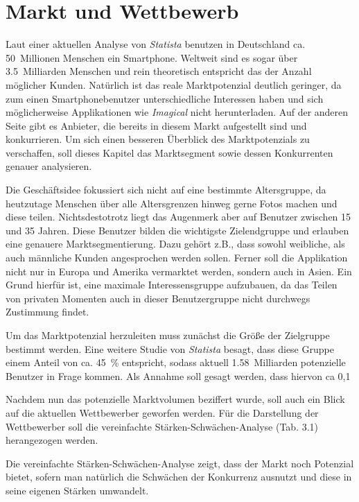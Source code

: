 \chapter{Markt und Wettbewerb}
Laut einer aktuellen Analyse von \textit{Statista} benutzen in Deutschland ca. 50~Millionen Menschen ein Smartphone. Weltweit sind es sogar über 3.5~Milliarden Menschen und rein theoretisch entspricht das der Anzahl möglicher Kunden. Natürlich ist das reale Marktpotenzial deutlich geringer, da zum einen Smartphonebenutzer unterschiedliche Interessen haben und sich möglicherweise Applikationen wie \textit{Imagical} nicht herunterladen. Auf der anderen Seite gibt es Anbieter, die bereits in diesem Markt aufgestellt sind und konkurrieren. Um sich einen besseren Überblick des Marktpotenzials zu verschaffen, soll dieses Kapitel das Marktsegment sowie dessen Konkurrenten genauer analysieren.

Die Geschäftsidee fokussiert sich nicht auf eine bestimmte Altersgruppe, da heutzutage Menschen über alle Altersgrenzen hinweg gerne Fotos machen und diese teilen. Nichtsdestotrotz liegt das Augenmerk aber auf Benutzer zwischen 15 und 35 Jahren. Diese Benutzer bilden die wichtigste Zielendgruppe und erlauben eine genauere Marktsegmentierung. Dazu gehört z.B., dass sowohl weibliche, als auch männliche Kunden angesprochen werden sollen. Ferner soll die Applikation nicht nur in Europa und Amerika vermarktet werden, sondern auch in Asien. Ein Grund hierfür ist, eine maximale Interessensgruppe aufzubauen, da das Teilen von privaten Momenten auch in dieser Benutzergruppe nicht durchwegs Zustimmung findet.

Um das Marktpotenzial herzuleiten muss zunächst die Größe der Zielgruppe bestimmt werden. Eine weitere Studie von \textit{Statista} besagt, dass diese Gruppe einem Anteil von ca. 45~\% entspricht, sodass aktuell 1.58~Milliarden potenzielle Benutzer in Frage kommen. Als Annahme soll gesagt werden, dass hiervon ca 0,1%

Nachdem nun das potenzielle Marktvolumen beziffert wurde, soll auch ein Blick auf die aktuellen Wettbewerber geworfen werden. Für die Darstellung der Wettbewerber soll die vereinfachte Stärken-Schwächen-Analyse (Tab. 3.1) herangezogen werden.

Die vereinfachte Stärken-Schwächen-Analyse zeigt, dass der Markt noch Potenzial bietet, sofern man natürlich die Schwächen der Konkurrenz ausnutzt und diese in seine eigenen Stärken umwandelt.

